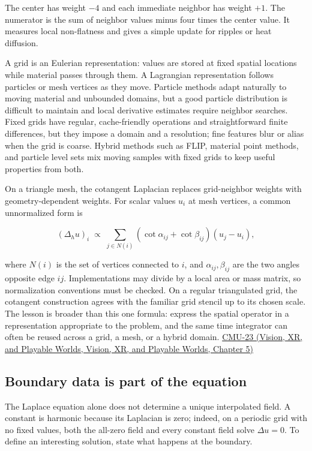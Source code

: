 The center has weight \(-4\) and each immediate neighbor has weight \(+1\). The numerator is the sum of neighbor values minus four times the center value. It measures local non-flatness and gives a simple update for ripples or heat diffusion.

A grid is an Eulerian representation: values are stored at fixed spatial locations while material passes through them. A Lagrangian representation follows particles or mesh vertices as they move. Particle methods adapt naturally to moving material and unbounded domains, but a good particle distribution is difficult to maintain and local derivative estimates require neighbor searches. Fixed grids have regular, cache-friendly operations and straightforward finite differences, but they impose a domain and a resolution; fine features blur or alias when the grid is coarse. Hybrid methods such as FLIP, material point methods, and particle level sets mix moving samples with fixed grids to keep useful properties from both.

On a triangle mesh, the cotangent Laplacian replaces grid-neighbor weights with geometry-dependent weights. For scalar values \(u_i\) at mesh vertices, a common unnormalized form is

\[
(\Delta_h u)_i\;\propto\;\sum_{j\in N(i)}(\cot\alpha_{ij}+\cot\beta_{ij})(u_j-u_i),
\]

where \(N(i)\) is the set of vertices connected to \(i\), and \(\alpha_{ij},\beta_{ij}\) are the two angles opposite edge \(ij\). Implementations may divide by a local area or mass matrix, so normalization conventions must be checked. On a regular triangulated grid, the cotangent construction agrees with the familiar grid stencil up to its chosen scale. The lesson is broader than this one formula: express the spatial operator in a representation appropriate to the problem, and the same time integrator can often be reused across a grid, a mesh, or a hybrid domain. \href{../07-Vision-XR-and-Playable-Worlds/main.pdf\#nameddest=04-visual-computing-ii-ch036-cmu-23---physically-based-animation-and-pdes}{CMU-23 (Vision, XR, and Playable Worlds, Vision, XR, and Playable Worlds, Chapter 5)}

\subsection{Boundary data is part of the equation}\label{04-visual-computing-ii-ch030-boundary-data-is-part-of-the-equation}

The Laplace equation alone does not determine a unique interpolated field. A constant is harmonic because its Laplacian is zero; indeed, on a periodic grid with no fixed values, both the all-zero field and every constant field solve \(\Delta u=0\). To define an interesting solution, state what happens at the boundary.


